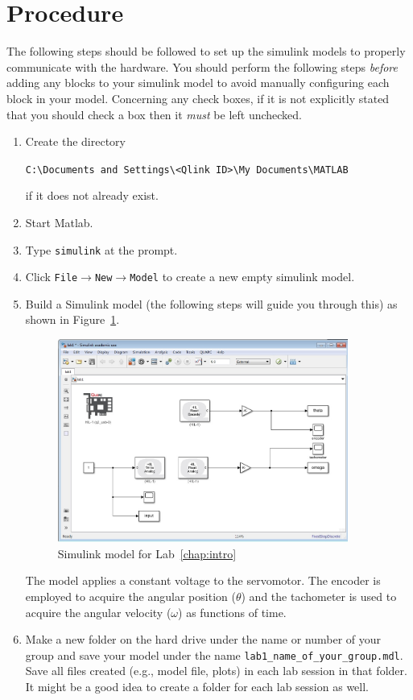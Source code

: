 \section{Procedure}

The following steps should be followed to set up the simulink models to
properly communicate with the hardware.  You should perform the following
steps \emph{before} adding any blocks to your simulink model to avoid
manually configuring each block in your model.  Concerning any check boxes,
if it is not explicitly stated that you should check a box then it
\emph{must} be left unchecked.
\begin{enumerate}
    \item Create the directory
          \begin{center}
              \verb|C:\Documents and Settings\<Qlink ID>\My Documents\MATLAB|
          \end{center}
          if it does not already exist.
    \item Start \textsf{Matlab}.
    \item Type \verb|simulink| at the prompt.
    \item Click \verb|File|\(\to \)\verb|New|\(\to \)\verb|Model| to create a new empty
          simulink model.
    \item Build a \textsf{Simulink} model (the following steps will guide you
          through this) as shown in Figure~\ref{fig:lab1}\@.
          \begin{figure}[htbp]
              \centering
              \includegraphics[width=0.9\textwidth]{pix/lab1.PNG}
              \caption{\textsf{Simulink} model for Lab~\ref{chap:intro}}\label{fig:lab1}
          \end{figure}%
          The model applies a constant voltage to the servomotor.  The encoder is
          employed to acquire the angular position (\(\theta \)) and the tachometer is
          used to acquire the angular velocity (\(\omega \)) as functions of time.
    \item Make a new folder on the hard drive under the name or number of your
          group and save your model under the name \verb|lab1_name_of_your_group.mdl|.
          Save all files created (e.g., model file, plots) in each lab session in that
          folder.  It might be a good idea to create a folder for each lab session as
          well.


\end{enumerate}
